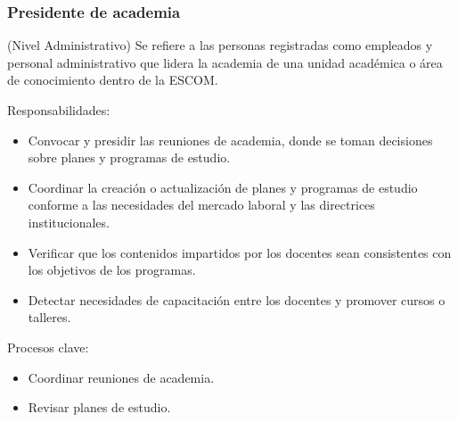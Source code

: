 \begin{Usuario}{\hypertarget{tPresidente}{\subsubsection{Presidente de academia}}}{(Nivel Administrativo)}{
    Se refiere a las personas registradas como empleados y personal administrativo que lidera la academia de una unidad académica o área de conocimiento dentro de la ESCOM.
    }
    \item[Responsabilidades:] \cdtEmpty
    \begin{itemize}
        \item Convocar y presidir las reuniones de academia, donde se toman decisiones sobre planes y programas de estudio.
        \item Coordinar la creación o actualización de planes y programas de estudio conforme a las necesidades del mercado laboral y las directrices institucionales.
        \item Verificar que los contenidos impartidos por los docentes sean consistentes con los objetivos de los programas.
        \item Detectar necesidades de capacitación entre los docentes y promover cursos o talleres.
    \end{itemize}
    \item[Procesos clave:] \cdtEmpty
    \begin{itemize}
         \item Coordinar reuniones de academia.
         \item Revisar planes de estudio.
    \end{itemize}
\end{Usuario}

